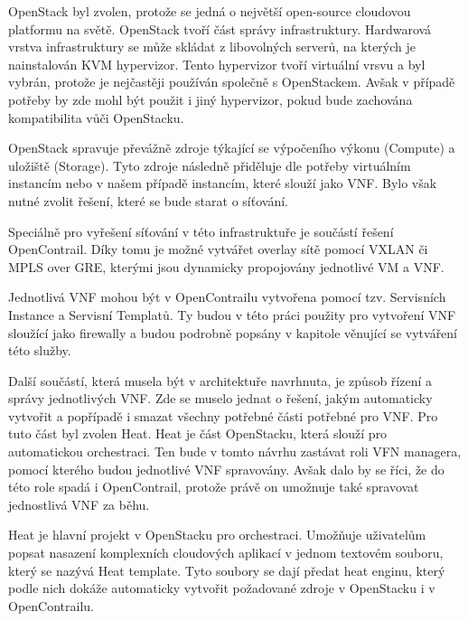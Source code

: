 OpenStack byl zvolen, protože se jedná o největší open-source cloudovou platformu na světě. OpenStack tvoří část správy infrastruktury. Hardwarová vrstva infrastruktury se může skládat z libovolných serverů, na kterých je nainstalován KVM hypervizor. Tento hypervizor tvoří virtuální vrsvu a byl vybrán, protože je nejčastěji používán společně s OpenStackem. Avšak v případě potřeby by zde mohl být použit i jiný hypervizor, pokud bude zachována kompatibilita vůči OpenStacku.

OpenStack spravuje převážně zdroje týkající se výpočeního výkonu (Compute) a uložiště (Storage). Tyto zdroje následně přiděluje dle potřeby virtuálním instancím nebo v našem případě instancím, které slouží jako VNF. Bylo však nutné zvolit řešení, které se bude starat o síťování.

Speciálně pro vyřešení síťování v této infrastruktuře je součástí řešení OpenContrail. Díky tomu je možné vytvářet overlay sítě pomocí VXLAN či MPLS over GRE, kterými jsou dynamicky propojovány jednotlivé VM a VNF. 

Jednotlivá VNF mohou být v OpenContrailu vytvořena pomocí tzv. Servisních Instance a Servisní Templatů. Ty budou v této práci použity pro vytvoření VNF sloužící jako firewally a budou podrobně popsány v kapitole věnující se vytváření této služby.

Další součástí, která musela být v architektuře navrhnuta, je způsob řízení a správy jednotlivých VNF. Zde se muselo jednat o řešení, jakým automaticky vytvořit a popřípadě i smazat všechny potřebné části potřebné pro VNF. Pro tuto část byl zvolen Heat. Heat je část OpenStacku, která slouží pro automatickou orchestraci. Ten bude v tomto návrhu zastávat roli VFN managera, pomocí kterého budou jednotlivé VNF spravovány. Avšak dalo by se říci, že do této role spadá i OpenContrail, protože právě on umožnuje také spravovat jednostlivá VNF za běhu.  

Heat je hlavní projekt v OpenStacku pro orchestraci. Umožňuje uživatelům popsat nasazení komplexních cloudových aplikací v jednom textovém souboru, který se nazývá Heat template. Tyto soubory se dají předat heat enginu, který podle nich dokáže automaticky vytvořit požadované zdroje v OpenStacku i v OpenContrailu. 

